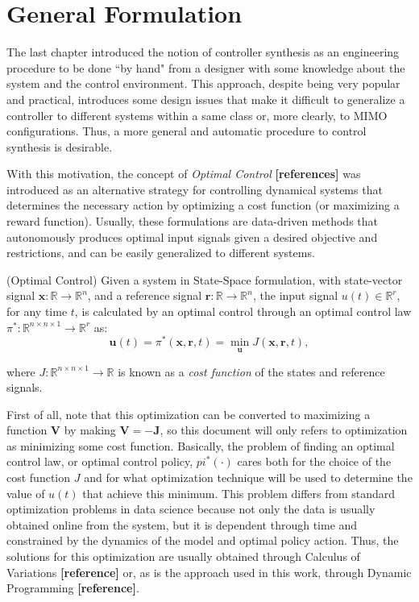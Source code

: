 \documentclass[a4paper,11pt]{book}
\numberwithin{figure}{chapter}
\numberwithin{equation}{chapter}
\numberwithin{table}{chapter}
\theoremstyle{definition}
\newtheorem{definition}{Definition}[chapter]
\newcounter{boxed-theorem}
\newcounter{boxed-definition}
\newenvironment{boxed-definition}[1]
{\begin{shaded} \begin{definition}{#1}}
{\end{definition} \end{shaded}}
\begin{document}
\section{General Formulation}

The last chapter introduced the notion of controller synthesis as an engineering procedure to be done ``by hand" from a designer with some knowledge about the system and the control environment. This approach, despite being very popular and practical, introduces some design issues that make it difficult to generalize a controller to different systems within a same class or, more clearly, to MIMO configurations. Thus, a more general and automatic procedure to control synthesis is desirable.

With this motivation, the concept of \textit{Optimal Control} \textbf{[references]} was introduced as an alternative strategy for controlling dynamical systems that determines the necessary action by optimizing a cost function (or maximizing a reward function). Usually, these formulations are data-driven methods that autonomously produces optimal input signals given a desired objective and restrictions, and can be easily generalized to different systems.

\begin{boxed-definition}{(Optimal Control)} \label{def:optimalControl}
Given a system in State-Space formulation, with state-vector signal $\bm{x} : \mathbb{R} \rightarrow \mathbb{R}^{n}$, and a reference signal $\bm{r} : \mathbb{R} \rightarrow \mathbb{R}^{n}$, the input signal $u(t) \in \mathbb{R}^r$, for any time $t$, is calculated by an optimal control through an optimal control law $\pi^* : \mathbb{R}^{n \times n \times 1} \rightarrow \mathbb{R}^r$ as:
    \begin{equation}
        \bm{u}(t) = \pi^*(\bm{x}, \bm{r}, t) = \min_{\bm{u}} J(\bm{x}, \bm{r}, t)
    ,\end{equation}
    
\noindent where $J : \mathbb{R}^{n \times n \times 1} \rightarrow \mathbb{R}$ is known as a \textit{cost function} of the states and reference signals.
\end{boxed-definition}

First of all, note that this optimization can be converted to maximizing a function $\bm{V}$ by making $\bm{V} = -\bm{J}$, so this document will only refers to optimization as minimizing some cost function. Basically, the problem of finding an optimal control law, or optimal control policy, $pi^*(\cdot)$ cares both for the choice of the cost function $J$ and for what optimization technique will be used to determine the value of $u(t)$ that achieve this minimum. This problem differs from standard optimization problems in data science because not only the data is usually obtained online from the system, but it is dependent through time and constrained by the dynamics of the model and optimal policy action. Thus, the solutions for this optimization are usually obtained through Calculus of Variations \textbf{[reference]} or, as is the approach used in this work, through Dynamic Programming \textbf{[reference]}.
\end{document}
